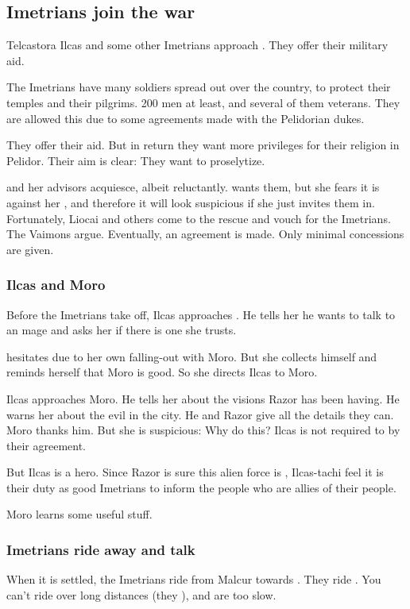 \begin{garbage}
\subsection{Imetrians join the war}
Telcastora Ilcas and some other Imetrians approach \Tiroco. 
They offer their military aid. 

The Imetrians have many soldiers spread out over the country, to protect their temples and their pilgrims. 
200 men at least, and several of them veterans. 
They are allowed this due to some agreements made with the Pelidorian dukes. 

They offer their aid. 
But in return they want more privileges for their religion in Pelidor. 
Their aim is clear: They want to proselytize. 

\Tiroco{} and her advisors acquiesce, albeit reluctantly. 
\Tiroco{} wants them, but she fears it is against her , and therefore it will look suspicious if she just invites them in. 
Fortunately, Liocai and others come to the rescue and vouch for the Imetrians. 
The Vaimons argue. 
Eventually, an agreement is made. 
Only minimal concessions are given. 





\subsubsection{Ilcas and Moro}
Before the Imetrians take off, Ilcas approaches \Tiroco. 
He tells her he wants to talk to an \Ishrah{} mage and asks her if there is one she trusts. 

\Tiroco{} hesitates due to her own falling-out with Moro. 
But she collects himself and reminds herself that Moro is good. 
So she directs Ilcas to Moro. 

Ilcas approaches Moro. 
He tells her about the visions Razor has been having. 
He warns her about the evil in the city. 
He and Razor give all the details they can. 
Moro thanks him. 
But she is suspicious: Why do this? 
Ilcas is not required to by their agreement. 

But Ilcas is a hero. 
Since Razor is sure this alien force is , Ilcas-tachi feel it is their duty as good Imetrians to inform the people who are allies of their people. 

Moro learns some useful stuff. 





\subsubsection{Imetrians ride away and talk}
When it is settled, the Imetrians ride from Malcur towards \Forklin. 
They ride \relcs. 
You can't ride \nycans{} over long distances (they ), and \mulgrons{} are too slow. 


\end{garbage}
